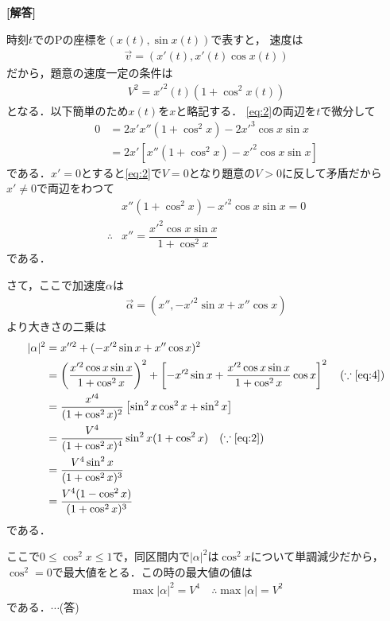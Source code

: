 \documentclass[../../main.tex]{subfiles}
\begin{document}
\begin{oframed}
  
\end{oframed}

{\bf [解答]}

時刻$t$でのPの座標を$(x(t),\sin x(t))$で表すと，
速度は
\begin{align}
  \vec{v} = (x'(t),x'(t)\cos x(t)) \label{eq:1}
\end{align}
だから，題意の速度一定の条件は
\begin{align}
  V^2=x'^2(t)(1+\cos^2 x(t)) \label{eq:2}
\end{align}
となる．以下簡単のため$x(t)$を$x$と略記する．
\cref{eq:2}の両辺を$t$で微分して
\begin{align}
  0
  & =2x'x''(1+\cos^2 x)-2x'^3\cos x\sin x \\
  & =2x'\left[x''(1+\cos^2 x)-x'^2\cos x\sin x\right] \label{eq:3}
\end{align}
である．$x'=0$とすると\cref{eq:2}で$V=0$となり題意の$V>0$に反して矛盾だから$x'\neq 0$で両辺をわつて
\begin{align}
  &x''(1+\cos^2 x)-x'^2\cos x\sin x=0 \\
  \therefore
  &x''=\dfrac{x'^2\cos x\sin x}{1+\cos^2 x}  \label{eq:4}
\end{align}
である．

さて，ここで加速度$\alpha$は
\begin{align}
  \vec{\alpha}=\left(x'',-x'^2\sin x+x''\cos x\right)
\end{align}
より大きさの二乗は
\begin{align}
  |\alpha|^2
  &=x''^2+(-x'^2\sin x+x''\cos x)^2 \\
  &=\left(\dfrac{x'^2\cos x\sin x}{1+\cos^2 x}\right)^2+\left[-x'^2\sin x+\dfrac{x'^2\cos x\sin x}{1+\cos^2 x}\cos x\right]^2 \quad (\because \text{\cref{eq:4}})\\
  &= \dfrac{x'^4}{(1+\cos^2 x)^2} \left[\sin^2x\cos^2x + \sin^2 x\right]  \\
  &= \dfrac{V^4}{(1+\cos^2 x)^4}\sin^2 x (1+\cos^2 x) \quad (\because \text{\cref{eq:2}})\\
  &= \dfrac{V^4\sin^2 x }{(1+\cos^2x)^3} \\
  &= \dfrac{V^4(1-\cos^2 x)}{(1+\cos^2x)^3}  \label{eq:5}
\end{align}
である．

ここで$0\le \cos^2x\le1$で，同区間内で$|\alpha|^2$は$\cos^2x$について単調減少だから，
$\cos^2=0$で最大値をとる．この時の最大値の値は
\begin{align}
  \max |\alpha|^2 = V^4 \quad \therefore \max |\alpha| = V^2
\end{align}
である．$\cdots$(答)
\newpage
\end{document}
